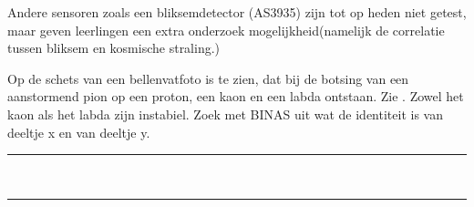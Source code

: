 Andere sensoren zoals een bliksemdetector (AS3935) zijn tot op heden niet getest,
maar geven leerlingen een extra onderzoek mogelijkheid(namelijk de correlatie tussen 
bliksem en kosmische straling.)

Op de schets van een bellenvatfoto is te zien, dat bij de botsing van een 
aanstormend pion op een proton, een kaon en een labda ontstaan. Zie 
.
Zowel het kaon als het labda zijn instabiel.
Zoek met BINAS uit wat de identiteit is van deeltje x en van deeltje y.
\begin{center}
    \rule{\textwidth}{0.3mm}\\
    \rule{\textwidth}{0.3mm}\\
\end{center}



